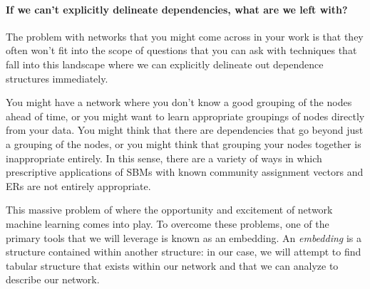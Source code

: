 \paragraph*{If we can't explicitly delineate dependencies, what are we left with?}

The problem with networks that you might come across in your work is that they often won't fit into the scope of questions that you can ask with techniques that fall into this landscape where we can explicitly delineate out dependence structures immediately. 

You might have a network where you don't know a good grouping of the nodes ahead of time, or you might want to learn appropriate groupings of nodes directly from your data. You might think that there are dependencies that go beyond just a grouping of the nodes, or you might think that grouping your nodes together is inappropriate entirely. In this sense, there are a variety of ways in which prescriptive applications of SBMs with known community assignment vectors and ERs are not entirely appropriate.

 This massive problem of  where the opportunity and excitement of network machine learning comes into play. To overcome these problems, one of the primary tools that we will leverage is known as an embedding. An \textit{embedding} is a structure contained within another structure: in our case, we will attempt to find tabular structure that exists within our network and that we can analyze to describe our network.

\newpage